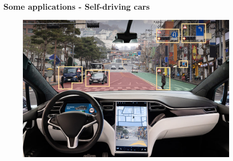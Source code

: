 \documentclass{beamer}
\begin{document}
	\begin{frame}
	\frametitle{Some applications - Self-driving cars}
	\begin{figure}
		\centering
		\includegraphics[scale=0.3]{images/self-driving-1}
	\end{figure}
	
\end{frame}
\end{document}
